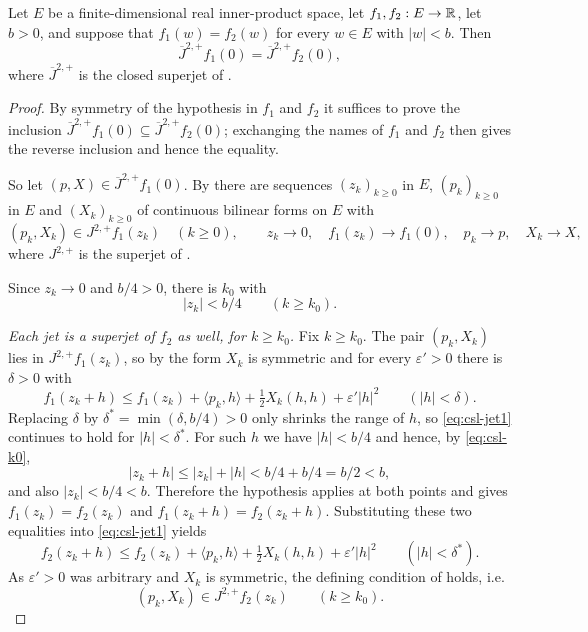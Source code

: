 \begin{lemma}
Let $E$ be a finite-dimensional real inner-product space, let $f_1,f_2:E\to\mathbb{R}$,
let $b>0$, and suppose that $f_1(w)=f_2(w)$ for every $w\in E$ with $|w|<b$.
Then
\[
  \overline J^{2,+}f_1(0)=\overline J^{2,+}f_2(0),
\]
where $\overline J^{2,+}$ is the closed superjet of .
\end{lemma}
\begin{proof}
By symmetry of the hypothesis in $f_1$ and $f_2$ it suffices to prove the
inclusion $\overline J^{2,+}f_1(0)\subseteq\overline J^{2,+}f_2(0)$; exchanging
the names of $f_1$ and $f_2$ then gives the reverse inclusion and hence the
equality.

So let $(p,X)\in\overline J^{2,+}f_1(0)$. By  there are
sequences $(z_k)_{k\ge0}$ in $E$, $(p_k)_{k\ge0}$ in $E$ and $(X_k)_{k\ge0}$ of
continuous bilinear forms on $E$ with
\begin{equation}\label{eq:csl-data}
  (p_k,X_k)\in J^{2,+}f_1(z_k)\quad(k\ge0),\qquad
  z_k\to0,\quad f_1(z_k)\to f_1(0),\quad p_k\to p,\quad X_k\to X,
\end{equation}
where $J^{2,+}$ is the superjet of .

Since $z_k\to0$ and $b/4>0$, there is $k_0$ with
\begin{equation}\label{eq:csl-k0}
  |z_k|<b/4\qquad(k\ge k_0).
\end{equation}

\emph{Each jet is a superjet of $f_2$ as well, for $k\ge k_0$.}
Fix $k\ge k_0$. The pair $(p_k,X_k)$ lies in $J^{2,+}f_1(z_k)$, so by
 the form $X_k$ is symmetric and for every $\varepsilon'>0$
there is $\delta>0$ with
\begin{equation}\label{eq:csl-jet1}
  f_1(z_k+h)\le f_1(z_k)+\langle p_k,h\rangle+\tfrac12X_k(h,h)
    +\varepsilon'|h|^2\qquad(|h|<\delta).
\end{equation}
Replacing $\delta$ by $\delta^\ast=\min(\delta,b/4)>0$ only shrinks the range of
$h$, so \eqref{eq:csl-jet1} continues to hold for $|h|<\delta^\ast$. For such
$h$ we have $|h|<b/4$ and hence, by \eqref{eq:csl-k0},
\[
  |z_k+h|\le|z_k|+|h|<b/4+b/4=b/2<b,
\]
and also $|z_k|<b/4<b$. Therefore the hypothesis applies at both points and
gives $f_1(z_k)=f_2(z_k)$ and $f_1(z_k+h)=f_2(z_k+h)$. Substituting these two
equalities into \eqref{eq:csl-jet1} yields
\[
  f_2(z_k+h)\le f_2(z_k)+\langle p_k,h\rangle+\tfrac12X_k(h,h)
    +\varepsilon'|h|^2\qquad(|h|<\delta^\ast).
\]
As $\varepsilon'>0$ was arbitrary and $X_k$ is symmetric, the defining condition
of  holds, i.e.
\begin{equation}\label{eq:csl-jet2}
  (p_k,X_k)\in J^{2,+}f_2(z_k)\qquad(k\ge k_0).
\end{equation}


\end{proof}
